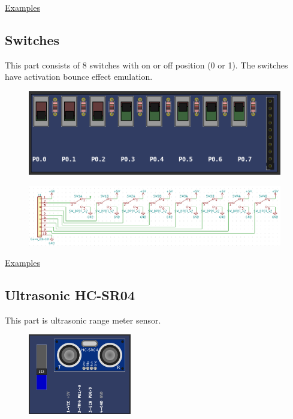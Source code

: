 \href{https://lcgamboa.github.io/picsimlab_examples/parts_SHT3X_(Temp._Hum.).html}{Examples}

\vspace{0.5cm}

\subsection{Switches}
This part consists of 8 switches with on or off position (0 or 1).
The switches have activation bounce effect emulation.

\begin{figure}[H]
\center
\includegraphics[width=0.99\textwidth]{img/part_switches.png} 
\end{figure} 

\begin{figure}[H]
\center
\includegraphics[width=0.99\textwidth]{img/part_switches_.png} 
\end{figure} 

\href{https://lcgamboa.github.io/picsimlab_examples/parts_Switches.html}{Examples}



\subsection{Ultrasonic HC-SR04}
This part is ultrasonic range meter sensor.

\begin{figure}[H]
\center
\includegraphics[width=0.4\textwidth]{img/part_hcsr04.png} 
\end{figure} 


